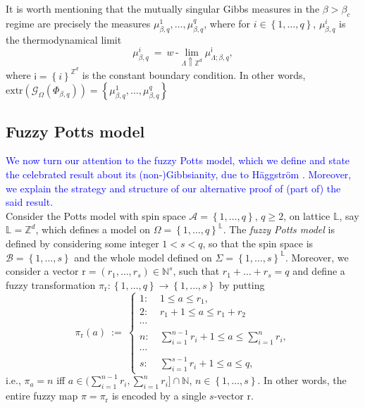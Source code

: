 \documentclass[12pt]{article}
\newcommand{\A}{\mathcal{A}}
\newcommand{\B}{\mathcal{B}}
\newcommand{\G}{\mathcal{G}}
\renewcommand{\L}{\mathbb{L}}
\newcommand{\N}{\mathbb{N}}
\renewcommand{\r}{\mathrm{r}}
\newcommand{\Z}{\mathbb{Z}}
\newcommand{\set}[1]{\left\{#1\right\}}
\newcommand{\ra}{\rightarrow}
\newcommand{\1}{\mathbbm{1}}
\newcommand{\5}{\vspace{0.5cm}}
\theoremstyle{definition}
\begin{document}
It is worth mentioning that the mutually singular Gibbs measures in the $\beta>\beta_c$ regime are precisely the measures $\mu_{\beta,q}^1,\ldots,\mu_{\beta,q}^q$, where for $i\in\set{1,\ldots,q}$, $\mu_{\beta,q}^i$ is the thermodynamical limit
$$\mu_{\beta,q}^i ~=~ w\,\text{-}\!\lim_{\Lambda\Uparrow\Z^d}\mu_{\Lambda;\beta,q}^{\mathsf{i}},$$
where $\mathsf{i}=\set{i}^{\Z^d}$ is the constant boundary condition. In other words, $\mathrm{extr}(\G_{\Omega}(\Phi_{\beta,q}))=\set{\mu_{\beta,q}^1,\ldots,\mu_{\beta,q}^q}$


\subsection{Fuzzy Potts model}

\textcolor{blue}{We now turn our attention to the fuzzy Potts model, which we define and state the celebrated result about its (non-)Gibbsianity, due to H\"aggstr\"om \cite{Hag}. Moreover, we explain the strategy and structure of our alternative proof of (part of) the said result.} \\

Consider the Potts model with spin space $\A=\set{1,\ldots,q}$, $q\geq 2$, on lattice $\L$, say $\L=\Z^d$, which defines a model on $\Omega=\set{1,\ldots,q}^\L$. The \textit{fuzzy Potts model} is defined by considering some integer $1<s<q$, so that the spin space is $\B=\set{1,\ldots,s}$ and the whole model defined on $\Sigma=\set{1,\ldots,s}^\L$. Moreover, we consider a vector $\r=(r_1,\ldots,r_s)\in\N^s$, such that $r_1+\ldots+r_s=q$ and define a fuzzy transformation $\pi_\r:\set{1,\ldots,q}\ra\set{1,\ldots,s}$ by putting 
$$\pi_\r(a) ~:=~ \begin{cases}
1: ~&1\leq a\leq r_1,\\
2: ~&r_1+1\leq a\leq r_1+r_2 \\
\cdots \\
n: ~&\sum_{i=1}^{n-1} r_i + 1\leq a\leq \sum_{i=1}^n r_i,\\
\cdots \\
s: ~&\sum_{i=1}^{s-1}r_i + 1\leq a\leq q,
\end{cases}$$
i.e., $\pi_a=n$ iff $a\in(\sum_{i=1}^{n-1}r_i,\sum_{i=1}^n r_i]\cap \N$, $n\in\set{1,\ldots,s}$. In other words, the entire fuzzy map $\pi=\pi_\r$ is encoded by a single $s$-vector $\r$. \\
\end{document}
